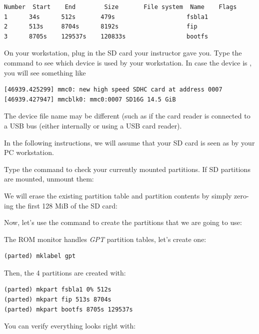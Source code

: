 \begin{verbatim}
Number  Start    End        Size       File system  Name    Flags
1      34s      512s       479s                    fsbla1
2      513s     8704s      8192s                   fip
3      8705s    129537s    120833s                 bootfs
\end{verbatim}

On your workstation, plug in the SD card your instructor gave you. Type
the  command to see which device is used by your
workstation. In case the device is , you will see
something like

\begin{verbatim}
[46939.425299] mmc0: new high speed SDHC card at address 0007
[46939.427947] mmcblk0: mmc0:0007 SD16G 14.5 GiB
\end{verbatim}

The device file name may be different (such as 
if the card reader is connected to a USB bus (either internally
or using a USB card reader).

In the following instructions, we will assume that your SD card is
seen as  by your PC workstation.

Type the  command to check your currently mounted
partitions. If SD partitions are mounted, unmount them:


We will erase the existing partition table and partition contents
by simply zero-ing the first 128 MiB of the SD card:


Now, let's use the  command to create the partitions that
we are going to use:


The ROM monitor handles {\em GPT} partition tables, let's create one:

\begin{verbatim}
(parted) mklabel gpt
\end{verbatim}

Then, the 4 partitions are created with:
\begin{verbatim}
(parted) mkpart fsbla1 0% 512s
(parted) mkpart fip 513s 8704s
(parted) mkpart bootfs 8705s 129537s
\end{verbatim}

You can verify everything looks right with:

